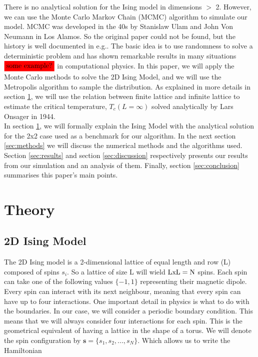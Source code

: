 \documentclass[english,notitlepage,reprint,nofootinbib]{revtex4-2}  %
\begin{document}
	There is no analytical solution for the Ising model in dimensions $>$ 2.
However, we can use the Monte Carlo Markov Chain (MCMC) algorithm to simulate
our model.
	MCMC was developed in the 40s by Stanislaw Ulam and John Von Neumann in Los
Alamos. So the original paper could not be found, but the history is well
documented in e.g.\cite{Robert_2011}. The basic idea is to use randomness to
solve a deterministic problem and has shown remarkable
	results in many situations $\colorbox{red}{some example?}$ in computational
physics. In this
	paper, we will apply the Monte Carlo methods to solve the 2D Ising Model, and
we will use the
	Metropolis algorithm to sample the distribution. As explained in more
details in section
	\ref{sec:theory}, we will use the relation between finite lattice and
infinite lattice to
	estimate the critical temperature, $T_c(L=\infty)$ solved analytically by
Lars Onsager in 1944. \\

	In section \ref{sec:theory}, we will formally explain the Ising Model
	with the analytical solution for the 2x2 case used as a benchmark for our algorithm. In the
	next section \ref{sec:methods} we will discuss the numerical methods and the algorithms
	used. Section \ref{sec:results} and section \ref{sec:discussion} respectively presents our
	results from our simulation and an analysis of them. Finally, section \ref{sec:conclusion} summarises this paper's main points.
	\section{Theory}\label{sec:theory}
\subsection{2D Ising Model} \label{subsec:Ising}
	The 2D Ising model is a 2-dimensional lattice of equal length and row (L) composed of spins
	$s_i$. So a lattice of size L will wield $\rm LxL=N$ spins. Each spin can take one of the
	following values $\{-1,	1\}$ representing their magnetic dipole. Every spin can interact
	with its next neighbour, meaning that every spin can have up to four interactions. One
	important detail in physics is what to do with the boundaries. In our case, we will consider
	a periodic boundary condition. This means that we will always consider four interactions
	for each spin. This is the geometrical equivalent of having a lattice in the shape of a
	torus. We will denote the spin configuration by $\textbf{s}=\{s_1, s_2, ..., s_N\}$. Which allows us
	to write the Hamiltonian
\end{document}
